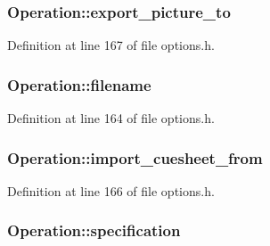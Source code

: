 \subsubsection[{\texorpdfstring{export\+\_\+picture\+\_\+to}{export_picture_to}}]{ Operation\+::export\+\_\+picture\+\_\+to}\hypertarget{struct_operation_af11305f7fbb4bef10adcf7dfb7db5cd5}{}\label{struct_operation_af11305f7fbb4bef10adcf7dfb7db5cd5}


Definition at line 167 of file options.\+h.

\subsubsection[{\texorpdfstring{filename}{filename}}]{ Operation\+::filename}\hypertarget{struct_operation_a08307a512df95f8430e3607a50185e59}{}\label{struct_operation_a08307a512df95f8430e3607a50185e59}


Definition at line 164 of file options.\+h.

\subsubsection[{\texorpdfstring{import\+\_\+cuesheet\+\_\+from}{import_cuesheet_from}}]{ Operation\+::import\+\_\+cuesheet\+\_\+from}\hypertarget{struct_operation_a6a4d77c3bf15de1da6d494574d9d2e1e}{}\label{struct_operation_a6a4d77c3bf15de1da6d494574d9d2e1e}


Definition at line 166 of file options.\+h.

\subsubsection[{\texorpdfstring{specification}{specification}}]{ Operation\+::specification}\hypertarget{struct_operation_a54b391a42469bb351257aed334a7afdb}{}\label{struct_operation_a54b391a42469bb351257aed334a7afdb}


